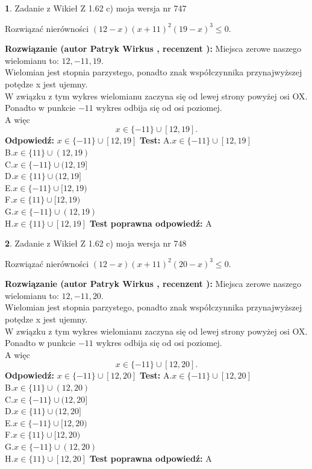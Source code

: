 \documentclass[12pt, a4paper]{article}
\theoremstyle{definition} %
\newtheorem{zad}{}
\newcommand{\zadStart}[1]{\begin{zad}#1\newline}
\newcommand{\zadStop}{\end{zad}}
\newcommand{\rozwStart}[2]{\noindent \textbf{Rozwiązanie (autor #1 , recenzent #2): }\newline}
\newcommand{\rozwStop}{\newline}
\newcommand{\odpStart}{\noindent \textbf{Odpowiedź:}\newline}
\newcommand{\odpStop}{\newline}
\newcommand{\testStart}{\noindent \textbf{Test:}\newline}
\newcommand{\testStop}{\newline}
\newcommand{\kluczStart}{\noindent \textbf{Test poprawna odpowiedź:}\newline}
\newcommand{\kluczStop}{\newline}
\begin{document}
\zadStart{Zadanie z Wikieł Z 1.62 c) moja wersja nr 747}

Rozwiązać nierówności $(12-x)(x+11)^{2}(19-x)^{3}\le0$.
\zadStop
\rozwStart{Patryk Wirkus}{}
Miejsca zerowe naszego wielomianu to: $12, -11, 19$.\\
Wielomian jest stopnia parzystego, ponadto znak współczynnika przy\linebreak najwyższej potędze x jest ujemny.\\ W związku z tym wykres wielomianu zaczyna się od lewej strony powyżej osi OX.\\
Ponadto w punkcie $-11$ wykres odbija się od osi poziomej.\\
A więc $$x \in \{-11\} \cup [12,19].$$
\rozwStop
\odpStart
$x \in \{-11\} \cup [12,19]$
\odpStop
\testStart
A.$x \in \{-11\} \cup [12,19]$\\
B.$x \in \{11\} \cup (12,19)$\\
C.$x \in \{-11\} \cup (12,19]$\\
D.$x \in \{11\} \cup (12,19]$\\
E.$x \in \{-11\} \cup [12,19)$\\
F.$x \in \{11\} \cup [12,19)$\\
G.$x \in \{-11\} \cup (12,19)$\\
H.$x \in \{11\} \cup [12,19]$
\testStop
\kluczStart
A
\kluczStop



\zadStart{Zadanie z Wikieł Z 1.62 c) moja wersja nr 748}

Rozwiązać nierówności $(12-x)(x+11)^{2}(20-x)^{3}\le0$.
\zadStop
\rozwStart{Patryk Wirkus}{}
Miejsca zerowe naszego wielomianu to: $12, -11, 20$.\\
Wielomian jest stopnia parzystego, ponadto znak współczynnika przy\linebreak najwyższej potędze x jest ujemny.\\ W związku z tym wykres wielomianu zaczyna się od lewej strony powyżej osi OX.\\
Ponadto w punkcie $-11$ wykres odbija się od osi poziomej.\\
A więc $$x \in \{-11\} \cup [12,20].$$
\rozwStop
\odpStart
$x \in \{-11\} \cup [12,20]$
\odpStop
\testStart
A.$x \in \{-11\} \cup [12,20]$\\
B.$x \in \{11\} \cup (12,20)$\\
C.$x \in \{-11\} \cup (12,20]$\\
D.$x \in \{11\} \cup (12,20]$\\
E.$x \in \{-11\} \cup [12,20)$\\
F.$x \in \{11\} \cup [12,20)$\\
G.$x \in \{-11\} \cup (12,20)$\\
H.$x \in \{11\} \cup [12,20]$
\testStop
\kluczStart
A
\kluczStop
\end{document}
